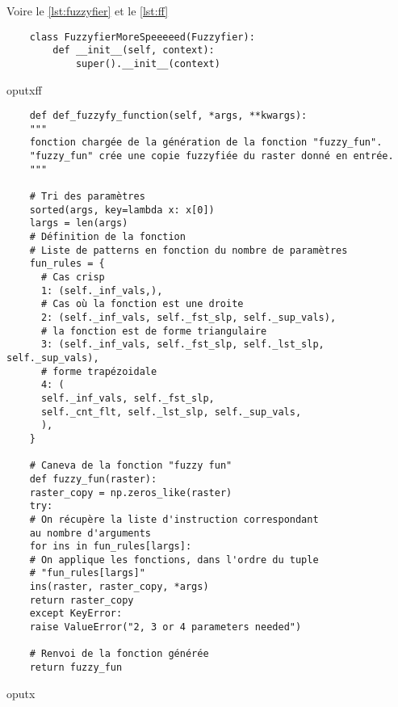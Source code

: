 Voire le \autoref{lst:fuzzyfier} et le \autoref{lst:ff}

\begin{code}
  \begin{verbatim}
    class FuzzyfierMoreSpeeeeed(Fuzzyfier):
        def __init__(self, context):
            super().__init__(context)
   \end{verbatim}
   \caption{oputxff}
      \label{lst:fuzzyfier}
\end{code}

\blindtext

\begin{code}
  \begin{verbatim}
    def def_fuzzyfy_function(self, *args, **kwargs):
    """
    fonction chargée de la génération de la fonction "fuzzy_fun".
    "fuzzy_fun" crée une copie fuzzyfiée du raster donné en entrée.
    """

    # Tri des paramètres
    sorted(args, key=lambda x: x[0])
    largs = len(args)
    # Définition de la fonction
    # Liste de patterns en fonction du nombre de paramètres
    fun_rules = {
      # Cas crisp
      1: (self._inf_vals,),
      # Cas où la fonction est une droite
      2: (self._inf_vals, self._fst_slp, self._sup_vals),
      # la fonction est de forme triangulaire
      3: (self._inf_vals, self._fst_slp, self._lst_slp, self._sup_vals),
      # forme trapézoidale
      4: (
      self._inf_vals, self._fst_slp,
      self._cnt_flt, self._lst_slp, self._sup_vals,
      ),
    }

    # Caneva de la fonction "fuzzy fun"
    def fuzzy_fun(raster):
    raster_copy = np.zeros_like(raster)
    try:
    # On récupère la liste d'instruction correspondant
    au nombre d'arguments
    for ins in fun_rules[largs]:
    # On applique les fonctions, dans l'ordre du tuple
    # "fun_rules[largs]"
    ins(raster, raster_copy, *args)
    return raster_copy
    except KeyError:
    raise ValueError("2, 3 or 4 parameters needed")

    # Renvoi de la fonction générée
    return fuzzy_fun
  \end{verbatim}
  \caption{oputx}
  \label{lst:ff}
\end{code}

\blindtext

